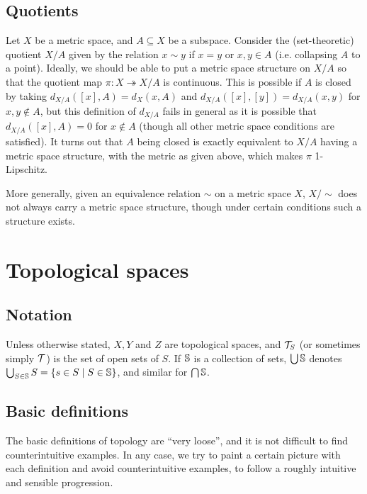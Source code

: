 \documentclass[11pt]{article}
\begin{document}
\subsection{Quotients}
Let $X$ be a metric space, and $A \subseteq X$ be a subspace. Consider the (set-theoretic) quotient $X / A$ given by the relation $x \sim y$ if $x = y$ or $x, y \in A$ (i.e. collapsing $A$ to a point). Ideally, we should be able to put a metric space structure on $X / A$ so that the quotient map $\pi : X \twoheadrightarrow X / A$ is continuous. This is possible if $A$ is closed by taking $d_{X/A}([x], A) = d_X(x, A)$ and $d_{X/A}([x], [y]) = d_{X/A}(x, y)$ for $x, y \not\in A$, but this definition of $d_{X / A}$ fails in general as it is possible that $d_{X/A}([x], A) = 0$ for $x \not\in A$ (though all other metric space conditions are satisfied). It turns out that $A$ being closed is exactly equivalent to $X / A$ having a metric space structure, with the metric as given above, which makes $\pi$ 1-Lipschitz.

More generally, given an equivalence relation $\sim$ on a metric space $X$, $X / \sim$ does not always carry a metric space structure, though under certain conditions such a structure exists.
\section{Topological spaces}
\subsection{Notation}
Unless otherwise stated, $X, Y$ and $Z$ are topological spaces, and $\Tau_S$ (or sometimes simply $\Tau$) is the set of open sets of $S$. If $\S$ is a collection of sets, $\bigcup \S$ denotes $\bigcup_{S \in \S} S = \set{s \in S \mid S \in \S}$, and similar for $\bigcap \S$.
\subsection{Basic definitions}
The basic definitions of topology are ``very loose'', and it is not difficult to find counterintuitive examples. In any case, we try to paint a certain picture with each definition and avoid counterintuitive examples, to follow a roughly intuitive and sensible progression. 
\end{document}
